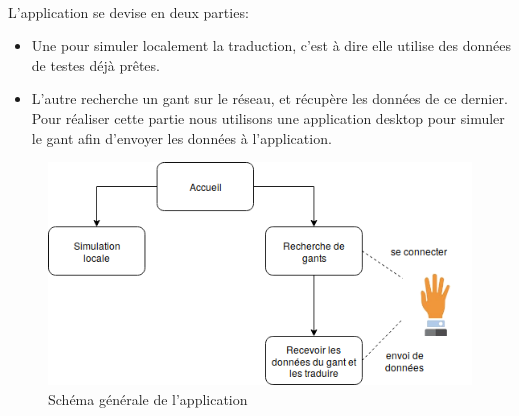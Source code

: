 \paragraph{}
L’application se devise en deux parties:
\begin{itemize}[label=\textbullet]
	\item Une pour simuler localement la traduction, c’est à dire elle utilise des données de testes déjà prêtes.
	\item L’autre recherche un gant sur le réseau, et récupère les données de ce dernier.
	Pour réaliser cette partie nous utilisons une application desktop pour simuler le gant afin d’envoyer les données à l’application. 
\end{itemize}
\begin{center}
	\begin{figure}[H]
		\centering
		\includegraphics[scale=0.67]{images/Schema.png}
		\caption{\small Schéma générale de l’application}
	\end{figure}
\end{center}


